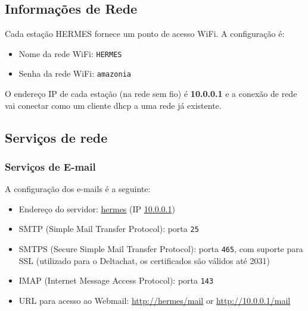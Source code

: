 \documentclass[11pt,a4paper]{article}
\begin{document}
\subsection{Informações de Rede}
\label{apx_net_info}

Cada estação HERMES fornece um ponto de acesso WiFi. A configuração é:

\begin{itemize}
\item Nome da rede WiFi: \texttt{HERMES}
\item Senha da rede WiFi: \texttt{amazonia}
\end{itemize}

O endereço IP de cada estação (na rede sem fio) é \textbf{10.0.0.1} e a conexão de rede vai conectar como um cliente dhcp a uma rede já existente.


\subsection{Serviços de rede} 
\label{apx_net_services}

\subsubsection{Serviços de E-mail}
\label{apx_net_email}

A configuração dos e-mails é a seguinte:

\begin{itemize}
    \item Endereço do servidor: \url{hermes} (IP \url{10.0.0.1})
    \item SMTP (Simple Mail Transfer Protocol): porta \texttt{25}
    \item SMTPS (Secure Simple Mail Transfer Protocol): porta \texttt{465}, com suporte para SSL  
    (utilizado para o Deltachat, os certificados são válidos até 2031)
    \item IMAP (Internet Message Access Protocol): porta \texttt{143}
    \item URL para acesso ao Webmail: \url{http://hermes/mail} or \url{http://10.0.0.1/mail}
\end{itemize}
\end{document}
